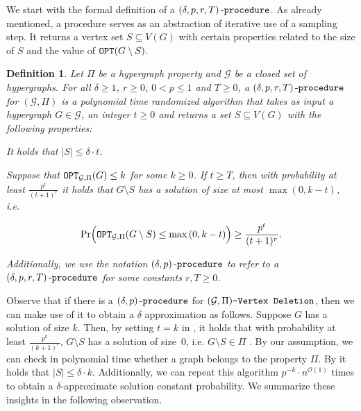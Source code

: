 \documentclass[letterpaper,11pt]{article}
\newcommand{\abs}[1]{{\left| #1\right|}}
\newcommand{\1}[1]{\mathds{1}\left[#1\right]}
\newcommand{\OPT}{\textnormal{\texttt{OPT}}}
\newcommand{\Oh}{\mathcal{O}}
\newcommand{\procext}[4]{\left( #1, #2, #3, #4 \right)\textnormal{-\texttt{procedure}}}
\newcommand{\proc}[2]{\left( #1, #2 \right)\textnormal{-\texttt{procedure}}}
\newtheorem{definition}[theorem]{Definition}
\newcommand{\gpivd}[1][\mathcal{G},\Pi]{(#1)\textnormal{\texttt{-Vertex Deletion}}}
\newcommand{\cG}{\mathcal{G}}
\begin{document}
We  start with the formal definition of a  $\procext{\delta}{p}{r}{T}$. As already mentioned,
a procedure serves as an abstraction of iterative use of a sampling step.
It returns a vertex set $S \subseteq V(G)$
with certain properties related to the size of $S$ and the value of $\OPT(G\setminus S)$. 
\begin{definition}\label{definition:proc}
	Let $\Pi$ be a hypergraph property and $\mathcal{G}$ be a closed set of hypergraphs.	
	For all $\delta \geq 1$, $r \geq 0$, $0 < p \leq 1$ and $T\geq 0$, a $\procext{\delta}{p}{r}{T}$ for $(\mathcal{G},\Pi)$ is a polynomial time randomized algorithm that takes as input a hypergraph $G \in \mathcal{G}$, an integer $t \geq 0$ and returns a set $S \subseteq V(G)$ with the following properties:
	\begin{properties}\item It holds that $\abs{S} \leq \delta \cdot t$.\label{prop:first}
	 
	\item \label{prop:second} Suppose that $\OPT_{\cG,\Pi}(G) \leq k$ for some $k \geq 0$. If $t \geq T$, then with probability at least $\frac{p^{t}}{(t+1)^{r}}$ it holds that $G \setminus S$ has a solution of size at most $\max\left( 0, k -t \right)$, i.e.

	\begin{equation*}
		\Pr\Bigl( \OPT_{\cG,\Pi}(G\setminus S) \leq \max\left( 0, k -t \right) \Bigr) \geq \frac{p^{t}}{(t+1)^{r}}.	
	\end{equation*}
		\end{properties}
	Additionally, we use the notation $\proc{\delta}{p}$ to refer to a $\procext{\delta}{p}{r}{T}$ for some constants $r,T \geq 0$. 
\end{definition}

Observe that if there is a $\proc{\delta}{p}$ for $\gpivd$, then
we can make use of it to obtain a $\delta$
approximation as follows.
Suppose $G$ has a solution of size $k$.
Then, by setting $t = k$
in , it holds that with probability at least
$\frac{p^{k}}{(k + 1)^{r}}$, $G\setminus S$ has a solution of size~$0$, i.e. $G\setminus S
\in \Pi$ . By our assumption, we can check in polynomial time whether a
graph belongs to the property $\Pi$. By  it holds that $\abs{S}\leq \delta\cdot  k$. Additionally, we can repeat this
algorithm $p^{-k} \cdot n^{\Oh(1)}$ times to obtain a $\delta$-approximate solution constant
probability. We summarize these insights in the following observation. 
\end{document}
